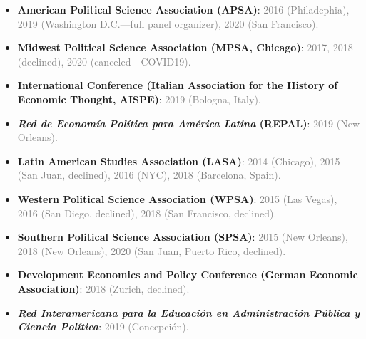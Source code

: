 \begin{itemize}
\item[\textcolor{gray}{\textbullet}] {\bf American Political Science Association (APSA)}: \textcolor{gray}{2016 (Philadephia), 2019 (Washington D.C.---full panel organizer), 2020 (San Francisco).}
\item[\textcolor{gray}{\textbullet}] {\bf Midwest Political Science Association (MPSA, Chicago)}: \textcolor{gray}{2017, 2018 (declined), 2020 (canceled---COVID19).}
\item[\textcolor{gray}{\textbullet}] {\bf International Conference (Italian Association for the History of Economic Thought, AISPE)}: \textcolor{gray}{2019 (Bologna, Italy).}
\item[\textcolor{gray}{\textbullet}] {\bf \emph{Red de Econom\'ia Pol\'itica para Am\'erica Latina} (REPAL)}: \textcolor{gray}{2019 (New Orleans).}
\item[\textcolor{gray}{\textbullet}] {\bf Latin American Studies Association (LASA)}: \textcolor{gray}{2014 (Chicago), 2015 (San Juan, declined), 2016 (NYC), 2018 (Barcelona, Spain).}
\item[\textcolor{gray}{\textbullet}] {\bf Western Political Science Association (WPSA)}: \textcolor{gray}{2015 (Las Vegas), 2016 (San Diego, declined), 2018 (San Francisco, declined).}
\item[\textcolor{gray}{\textbullet}] {\bf Southern Political Science Association (SPSA)}: \textcolor{gray}{2015 (New Orleans), 2018 (New Orleans), 2020 (San Juan, Puerto Rico, declined).}
\item[\textcolor{gray}{\textbullet}] {\bf Development Economics and Policy Conference (German Economic Association)}: \textcolor{gray}{2018 (Zurich, declined).}
\item[\textcolor{gray}{\textbullet}] {\bf \emph{Red Interamericana para la Educaci\'on en Administraci\'on P\'ublica y Ciencia Pol\'itica}}: \textcolor{gray}{2019 (Concepci\'on).}
\end{itemize}
